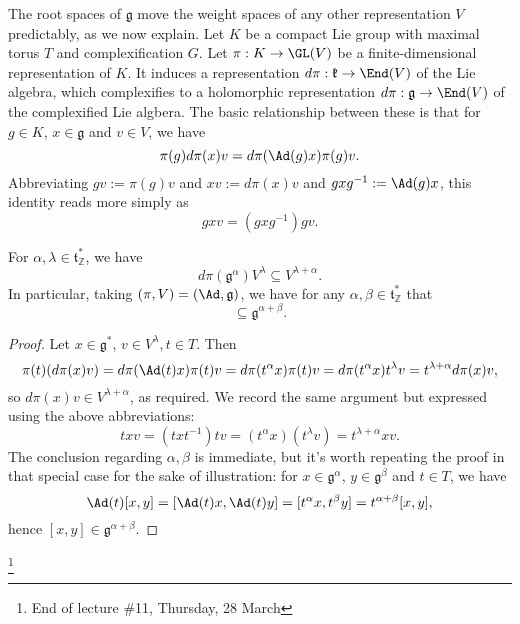 \documentclass[reqno]{amsart} 
\begin{document}
The root spaces of $\mathfrak{g}$ move the weight spaces of any other representation $V$ predictably, as we now explain.  Let $K$ be a compact Lie group with maximal torus $T$ and complexification $G$.  Let $\pi : K \rightarrow \GL(V)$ be a finite-dimensional representation of $K$.  It induces a representation $d \pi : \mathfrak{k} \rightarrow \End(V)$ of the Lie algebra, which complexifies to a holomorphic representation $d \pi : \mathfrak{g} \rightarrow \End(V)$ of the complexified Lie algbera.  The basic relationship between these is that for $g \in K$, $x \in \mathfrak{g}$ and $v \in V$, we have
\begin{equation*}
  \pi(g) d \pi(x) v = d \pi(\Ad(g) x) \pi(g) v.
\end{equation*}
Abbreviating $g v := \pi(g) v$ and $x v := d \pi(x) v$ and $g x g^{-1} := \Ad(g) x$, this identity reads more simply as
\begin{equation*}
  g x v = (g x g^{-1}) g v.
\end{equation*}
\begin{lemma}\label{lem:root-spaces-permute-weight-spaces}
  For $\alpha,\lambda \in \mathfrak{t}_{\mathbb{Z}}^*$, we have
  \begin{equation*}
    d \pi(\mathfrak{g}^\alpha) V^{\lambda} \subseteq V^{\lambda + \alpha}.
  \end{equation*}
  In particular, taking $(\pi,V) = (\Ad,\mathfrak{g})$, we have for any $\alpha, \beta \in \mathfrak{t}_{\mathbb{Z}}^*$ that
  \begin{equation*}
    [\mathfrak{g}^\alpha, \mathfrak{g}^{\beta}] \subseteq \mathfrak{g}^{\alpha+\beta}.
  \end{equation*}
\end{lemma}
\begin{proof}
  Let $x \in \mathfrak{g}^*$, $v \in V^{\lambda}, t \in T$.  Then
  \begin{equation}
    \pi(t) (d \pi(x) v)
    = d \pi(\Ad(t) x) \pi(t) v
    = d \pi(t^\alpha x) \pi(t) v
    = d \pi(t^\alpha  x) t^{\lambda} v
    = t^{\lambda+\alpha} d \pi(x) v,
  \end{equation}
  so $d \pi(x) v \in V^{\lambda+\alpha}$, as required.  We record the same argument but expressed using the above abbreviations:
  \begin{equation*}
    t x v = (t x t^{-1}) t v = (t^{\alpha} x) (t^{\lambda} v)= t^{\lambda + \alpha} x v.
  \end{equation*}
  The conclusion regarding $\alpha, \beta$ is immediate, but it's worth repeating the proof in that special case for the sake of illustration: for $x \in \mathfrak{g}^\alpha$, $y \in \mathfrak{g}^{\beta}$ and $t \in T$, we have
  \begin{equation*}
    \Ad(t) [x,y] = [\Ad(t) x, \Ad(t) y] = [t^{\alpha} x, t^{\beta} y] = t^{\alpha + \beta}[x,y],
  \end{equation*}
  hence $[x,y] \in \mathfrak{g}^{\alpha+\beta}$.
\end{proof}
\footnote{End of lecture \#11, Thursday, 28 March}
\end{document}
